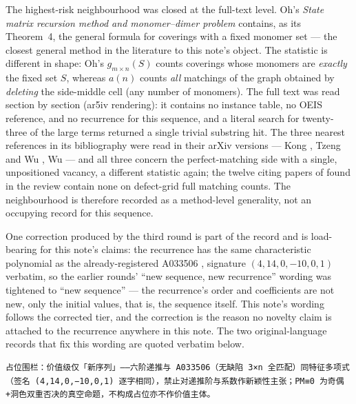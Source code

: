 \documentclass[11pt]{article}
\theoremstyle{definition}
\begin{document}
The highest-risk neighbourhood was closed at the full-text level. Oh's
\emph{State matrix recursion method and monomer--dimer problem} \cite{oh2019}
contains, as its Theorem~4, the general formula for coverings with a fixed
monomer set --- the closest general method in the literature to this note's
object. The statistic is different in shape: Oh's $g_{m\times n}(S)$ counts
coverings whose monomers are \emph{exactly} the fixed set $S$, whereas $a(n)$
counts \emph{all} matchings of the graph obtained by \emph{deleting} the
side-middle cell (any number of monomers). The full text was read section by
section (ar5iv rendering): it contains no instance table, no OEIS reference,
and no recurrence for this sequence, and a literal search for twenty-three of
the large terms returned a single trivial substring hit. The three nearest
references in its bibliography were read in their arXiv versions --- Kong
\cite{kong}, Tzeng and Wu \cite{tzeng-wu}, Wu \cite{wu2006} --- and all three
concern the perfect-matching side with a single, unpositioned vacancy, a
different statistic again; the twelve citing papers of \cite{oh2019} found in
the review contain none on defect-grid full matching counts. The
neighbourhood is therefore recorded as a method-level generality, not an
occupying record for this sequence.

One correction produced by the third round is part of the record and is
load-bearing for this note's claims: the recurrence has the same
characteristic polynomial as the already-registered A033506
\cite{oeis-a033506}, signature $(4,14,0,-10,0,1)$ verbatim, so the earlier
rounds' ``new sequence, new recurrence'' wording was tightened to ``new
sequence'' --- the recurrence's order and coefficients are not new, only the
initial values, that is, the sequence itself. This note's wording follows the
corrected tier, and the correction is the reason no novelty claim is attached
to the recurrence anywhere in this note. The two original-language records
that fix this wording are quoted verbatim below.

\begin{lstlisting}[caption={Verbatim quote, original record (Chinese, kept untranslated): the priority fence locked on the source candidate card and repeated in the frozen statement file header (\texttt{proofs/01-comb08-sidemid-statements.lean}, lines 18--20).}, basicstyle=\ttfamily\footnotesize,frame=none,label={lst:fence}]
占位围栏：价值级仅「新序列」——六阶递推与 A033506（无缺陷 3×n 全匹配）同特征多项式（签名 (4,14,0,−10,0,1) 逐字相同），禁止对递推阶与系数作新颖性主张；PM≡0 为奇偶+洞色双重否决的真空命题，不构成占位亦不作价值主体。
\end{lstlisting}
\end{document}
